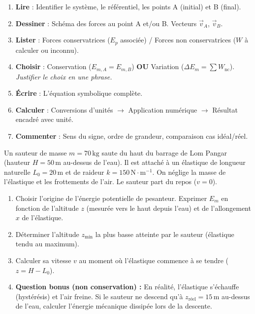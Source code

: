 \documentclass[11pt]{article}
\begin{document}
\begin{methode}
\begin{enumerate}
    \item \textbf{Lire} : Identifier le système, le référentiel, les points A (initial) et B (final).
    \item \textbf{Dessiner} : Schéma des forces au point A et/ou B. Vecteurs $\vec{v}_A$, $\vec{v}_B$.
    \item \textbf{Lister} : Forces conservatrices ($E_p$ associée) / Forces non conservatrices ($W$ à calculer ou inconnu).
    \item \textbf{Choisir} : Conservation ($E_{m,A}=E_{m,B}$) \textbf{OU} Variation ($\Delta E_m = \sum W_{\text{nc}}$). \emph{Justifier le choix en une phrase.}
    \item \textbf{Écrire} : L'équation symbolique complète.
    \item \textbf{Calculer} : Conversions d'unités $\rightarrow$ Application numérique $\rightarrow$ Résultat encadré avec unité.
    \item \textbf{Commenter} : Sens du signe, ordre de grandeur, comparaison cas idéal/réel.
\end{enumerate}
\end{methode}

\begin{exercice}
Un sauteur de masse $m = 70\,\text{kg}$ saute du haut du barrage de Lom Pangar (hauteur $H = 50\,\text{m}$ au-dessus de l'eau). Il est attaché à un élastique de longueur naturelle $L_0 = 20\,\text{m}$ et de raideur $k = 150\,\text{N}\!\cdot\!\text{m}^{-1}$. On néglige la masse de l'élastique et les frottements de l'air. Le sauteur part du repos ($v=0$).
\begin{enumerate}
    \item Choisir l'origine de l'énergie potentielle de pesanteur. Exprimer $E_{m}$ en fonction de l'altitude $z$ (mesurée vers le haut depuis l'eau) et de l'allongement $x$ de l'élastique.
    \item Déterminer l'altitude $z_{\text{min}}$ la plus basse atteinte par le sauteur (élastique tendu au maximum).
    \item Calculer sa vitesse $v$ au moment où l'élastique commence à se tendre ($z = H - L_0$).
    \item \textbf{Question bonus (non conservation) :} En réalité, l'élastique s'échauffe (hystérésis) et l'air freine. Si le sauteur ne descend qu'à $z_{\text{réel}} = 15\,\text{m}$ au-dessus de l'eau, calculer l'énergie mécanique dissipée lors de la descente.
\end{enumerate}
\end{exercice}
\end{document}
